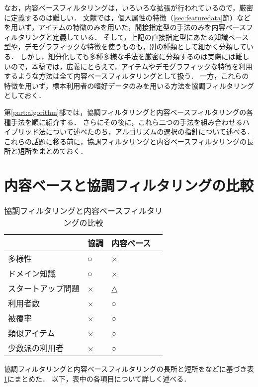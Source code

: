 なお，内容ベースフィルタリングは，いろいろな拡張が行われているので，厳密に定義するのは難しい．
文献\cite{ej:048}では，個人属性の特徴（\ref{sec:featuredata}節）などを用いず，アイテムの特徴のみを用いた，間接指定型の手法のみを内容ベースフィルタリングと定義している．
そして，上記の直接指定型にあたる知識ベース型や，デモグラフィックな特徴を使うものも，別の種類として細かく分類している．
しかし，細分化しても多種多様な手法を厳密に分類するのは実際には難しいので，本稿では，広義にとらえて，アイテムやデモグラフィックな特徴を利用するような方法は全て内容ベースフィルタリングとして扱う．
一方，これらの特徴を用いず，標本利用者の嗜好データのみを用いる方法を協調フィルタリングとしておく．

第\ref{part:algorithm}部では，協調フィルタリングと内容ベースフィルタリングの各種手法を順に紹介する．
さらにその後に，これら二つの手法を組み合わせるハイブリッド法について述べたのち，アルゴリズムの選択の指針について述べる．
これらの話題に移る前に，協調フィルタリングと内容ベースフィルタリングの長所と短所をまとめておく．

\section{内容ベースと協調フィルタリングの比較}
\label{sec:cfcbfcomp}

\begin{table}
\centering
\caption{協調フィルタリングと内容ベースフィルタリングの比較}
\label{tab:cfcbfcomp}
\begin{tabular}{l@{\qquad}>{\centering}p{}>{\centering}p{}p{0pt}}\toprule
 & 協調 & 内容ベース & \\\midrule
多様性 & ○ & × & \\
ドメイン知識 & ○ & × & \\
スタートアップ問題 & × & △ & \\
利用者数 & × & ○ & \\
被覆率 & × & ○ & \\
類似アイテム & × & ○ & \\
少数派の利用者 & × & ○ & \\
\bottomrule
\end{tabular}
\end{table}

協調フィルタリングと内容ベースフィルタリングの長所と短所を\cite{macm:97:02,ej:048}などに基づき表\ref{tab:cfcbfcomp}にまとめた．
以下，表中の各項目について詳しく述べる．

